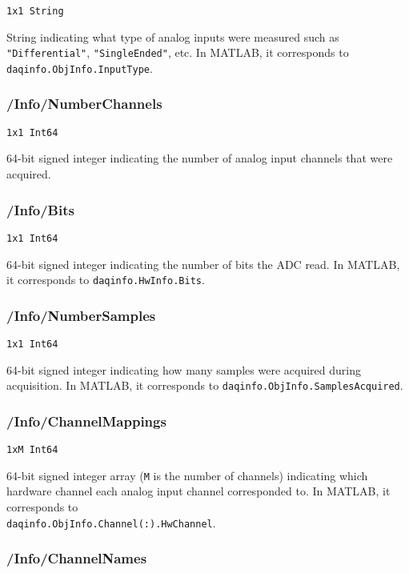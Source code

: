 \documentclass[12pt]{article} %
\begin{document}
\verb|1x1 String|

String indicating what type of analog inputs were measured such as \verb|"Differential"|, \verb|"SingleEnded"|, etc.
In MATLAB\textsuperscript{\textregistered}, it corresponds to \verb|daqinfo.ObjInfo.InputType|.



\subsubsection{/Info/NumberChannels}

\verb|1x1 Int64|

64-bit signed integer indicating the number of analog input channels that were acquired.



\subsubsection{/Info/Bits}

\verb|1x1 Int64|

64-bit signed integer indicating the number of bits the ADC read.
In MATLAB\textsuperscript{\textregistered}, it corresponds to \verb|daqinfo.HwInfo.Bits|.



\subsubsection{/Info/NumberSamples}

\verb|1x1 Int64|

64-bit signed integer indicating how many samples were acquired during acquisition.
In MATLAB\textsuperscript{\textregistered}, it corresponds to \verb|daqinfo.ObjInfo.SamplesAcquired|.



\subsubsection{/Info/ChannelMappings}

\verb|1xM Int64|

64-bit signed integer array (\verb|M| is the number of channels) indicating which hardware channel each analog input channel corresponded to.
In MATLAB\textsuperscript{\textregistered}, it corresponds to \\ \verb|daqinfo.ObjInfo.Channel(:).HwChannel|.



\subsubsection{/Info/ChannelNames}
\end{document}
